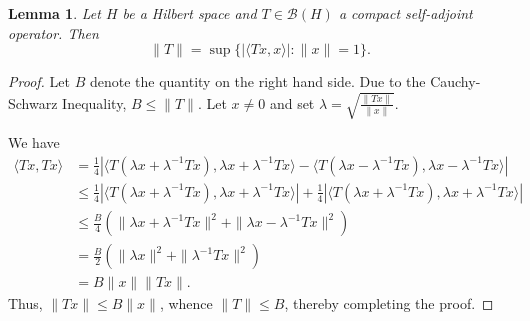 \documentclass[11pt]{article}
\theoremstyle{thmstyle}
\newtheorem{lemma}[theorem]{Lemma}
\theoremstyle{defstyle}
\newcommand{\scrB}{\mathscr B}
\renewcommand{\le}{\leqslant}
\begin{document}
\begin{lemma}
    Let $H$ be a Hilbert space and $T\in\scrB(H)$ a compact self-adjoint operator. Then 
    \begin{equation*}
        \|T\| = \sup\{|\langle Tx, x\rangle|\colon \|x\| = 1\}.
    \end{equation*}
\end{lemma}
\begin{proof}
    Let $B$ denote the quantity on the right hand side. Due to the Cauchy-Schwarz Inequality, $B\le\|T\|$. Let $x\ne 0$ and set $\lambda = \sqrt{\frac{\|Tx\|}{\|x\|}}$.

    We have 
    \begin{align*}
        \langle Tx, Tx\rangle &= \frac{1}{4}\left|\langle T(\lambda x + \lambda^{-1}Tx), \lambda x + \lambda^{-1}Tx\rangle - \langle T(\lambda x - \lambda^{-1}Tx), \lambda x - \lambda^{-1}Tx\rangle\right|\\
        &\le\frac{1}{4}\left|\langle T(\lambda x + \lambda^{-1}Tx), \lambda x + \lambda^{-1}Tx\rangle\right| + \frac{1}{4}\left|\langle T(\lambda x + \lambda^{-1}Tx), \lambda x + \lambda^{-1}Tx\rangle\right|\\
        &\le\frac{B}{4}\left(\|\lambda x + \lambda^{-1}Tx\|^2 + \|\lambda x - \lambda^{-1}Tx\|^2\right)\\
        &=\frac{B}{2}\left(\|\lambda x\|^2 + \|\lambda^{-1}Tx\|^2\right)\\
        &= B\|x\|\|Tx\|.
    \end{align*}
    Thus, $\|Tx\|\le B\|x\|$, whence $\|T\|\le B$, thereby completing the proof.
\end{proof}
\end{document}
